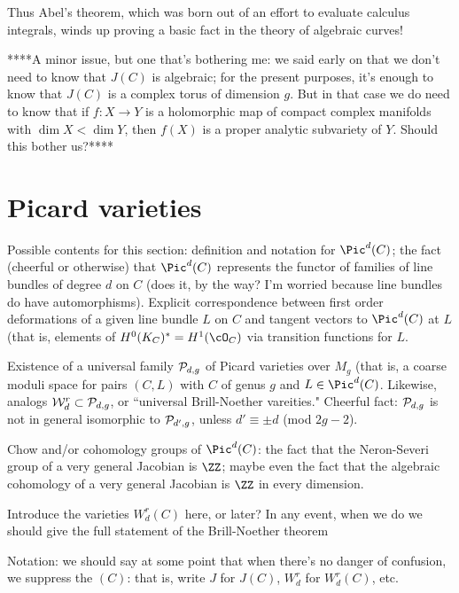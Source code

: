 Thus Abel's theorem, which was born out of an effort to evaluate calculus integrals, winds up proving a basic fact in the theory of algebraic curves!


****A minor issue, but one that's bothering me: we said early on that we don't need to know that $J(C)$ is algebraic; for the present purposes, it's enough to know that $J(C)$ is a  complex torus of dimension $g$. But in that case we do need to know that if $f : X \to Y$ is a holomorphic map of compact complex manifolds with $\dim X < \dim Y$, then $f(X)$ is a proper analytic subvariety of $Y$. Should this bother us?****


\section{Picard varieties}

Possible contents for this section: definition and notation for $\Pic^d(C)$; the fact (cheerful or otherwise) that $\Pic^d(C)$ represents the functor of families of line bundles of degree $d$ on $C$ (does it, by the way? I'm worried because line bundles do have automorphisms). Explicit correspondence between first order deformations of a given line bundle $L$ on $C$ and tangent vectors to $\Pic^d(C)$ at $L$ (that is, elements of $H^0(K_C)^* = H^1(\cO_C)$ via transition functions for $L$.

\def\cW{{\mathcal W}}

Existence of a universal family $\cP_{d,g}$ of Picard varieties over $M_g$ (that is, a coarse moduli space for pairs $(C,L)$ with $C$ of genus $g$ and $L \in \Pic^d(C)$. Likewise, analogs $\cW^r_d \subset \cP_{d,g}$, or ``universal Brill-Noether vareities."
Cheerful fact: $\cP_{d,g}$ is not in general isomorphic to $\cP_{d',g}$, unless $d' \equiv
 \pm d$ (mod $2g-2$). 
 
 Chow and/or cohomology groups of $\Pic^d(C)$: the fact that the Neron-Severi group of a very general Jacobian is $\ZZ$; maybe even the fact that the algebraic cohomology of a very general Jacobian is $\ZZ$ in every dimension.
 
 Introduce the varieties $W^r_d(C)$ here, or later? In any event, when we do we should give the full statement of the Brill-Noether theorem
 
 Notation: we should say at some point that when there's no danger of confusion, we suppress the $(C)$: that is, write $J$ for $J(C)$, $W^r_d$ for $W^r_d(C)$, etc.

